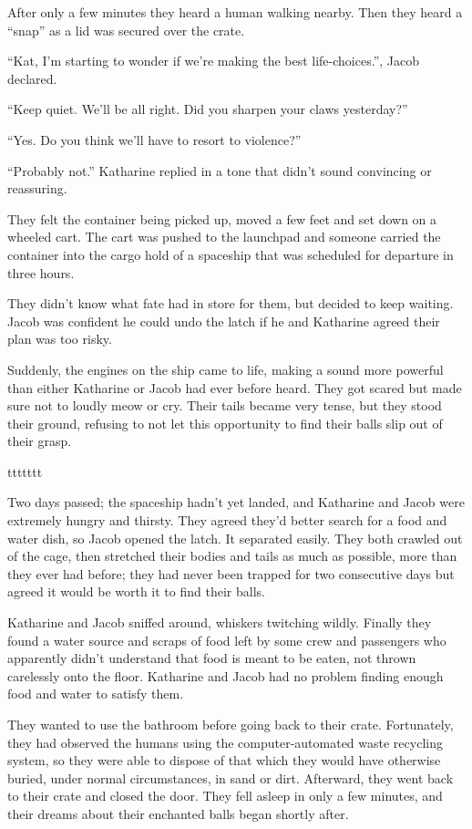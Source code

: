 After only a few minutes they heard a human walking nearby. Then they heard a “snap” as a lid was secured over the crate.

“Kat, I'm starting to wonder if we're making the best life-choices.”, Jacob declared.

“Keep quiet. We'll be all right. Did you sharpen your claws yesterday?”

“Yes. Do you think we'll have to resort to violence?”

“Probably not.” Katharine replied in a tone that didn't sound convincing or reassuring.

They felt the container being picked up, moved a few feet and set down on a wheeled cart. The cart was pushed to the launchpad and someone carried the container into the cargo hold of a spaceship that was scheduled for departure in three hours.

They didn't know what fate had in store for them, but decided to keep waiting. Jacob was confident he could undo the latch if he and Katharine agreed their plan was too risky.

Suddenly, the engines on the ship came to life, making a sound more powerful than either Katharine or Jacob had ever before heard. They got scared but made sure not to loudly meow or cry. Their tails became very tense, but they stood their ground, refusing to not let this opportunity to find their balls slip out of their grasp.



ttttttt



Two days passed; the spaceship hadn't yet landed, and Katharine and Jacob were extremely hungry and thirsty. They agreed they'd better search for a food and water dish, so Jacob opened the latch. It separated easily. They both crawled out of the cage, then stretched their bodies and tails as much as possible, more than they ever had before; they had never been trapped for two consecutive days but agreed it would be worth it to find their balls.

Katharine and Jacob sniffed around, whiskers twitching wildly. Finally they found a water source and scraps of food left by some crew and passengers who apparently didn't understand that food is meant to be eaten, not thrown carelessly onto the floor. Katharine and Jacob had no problem finding enough food and water to satisfy them.

They wanted to use the bathroom before going back to their crate. Fortunately, they had observed the humans using the computer-automated waste recycling system, so they were able to dispose of that which they would have otherwise buried, under normal circumstances, in sand or dirt. Afterward, they went back to their crate and closed the door. They fell asleep in only a few minutes, and their dreams about their enchanted balls began shortly after.



